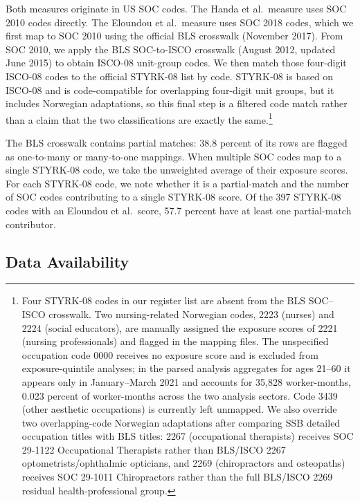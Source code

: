 \documentclass[12pt]{article}
\begin{document}
Both measures originate in US SOC codes. The Handa et al.\ measure uses SOC 2010 codes directly. The Eloundou et al.\ measure uses SOC 2018 codes, which we first map to SOC 2010 using the official BLS crosswalk (November 2017). From SOC 2010, we apply the BLS SOC-to-ISCO crosswalk (August 2012, updated June 2015) to obtain ISCO-08 unit-group codes. We then match those four-digit ISCO-08 codes to the official STYRK-08 list by code. STYRK-08 is based on ISCO-08 and is code-compatible for overlapping four-digit unit groups, but it includes Norwegian adaptations, so this final step is a filtered code match rather than a claim that the two classifications are exactly the same.\footnote{Four STYRK-08 codes in our register list are absent from the BLS SOC--ISCO crosswalk. Two nursing-related Norwegian codes, 2223 (nurses) and 2224 (social educators), are manually assigned the exposure scores of 2221 (nursing professionals) and flagged in the mapping files. The unspecified occupation code 0000 receives no exposure score and is excluded from exposure-quintile analyses; in the parsed analysis aggregates for ages 21--60 it appears only in January--March 2021 and accounts for 35,828 worker-months, 0.023 percent of worker-months across the two analysis sectors. Code 3439 (other aesthetic occupations) is currently left unmapped. We also override two overlapping-code Norwegian adaptations after comparing SSB detailed occupation titles with BLS titles: 2267 (occupational therapists) receives SOC 29-1122 Occupational Therapists rather than BLS/ISCO 2267 optometrists/ophthalmic opticians, and 2269 (chiropractors and osteopaths) receives SOC 29-1011 Chiropractors rather than the full BLS/ISCO 2269 residual health-professional group.}

The BLS crosswalk contains partial matches: 38.8 percent of its rows are flagged as one-to-many or many-to-one mappings. When multiple SOC codes map to a single STYRK-08 code, we take the unweighted average of their exposure scores. For each STYRK-08 code, we note whether it is a partial-match and the number of SOC codes contributing to a single STYRK-08 score. Of the 397 STYRK-08 codes with an Eloundou et al.\ score, 57.7 percent have at least one partial-match contributor.


\subsection*{Data Availability}
\end{document}
